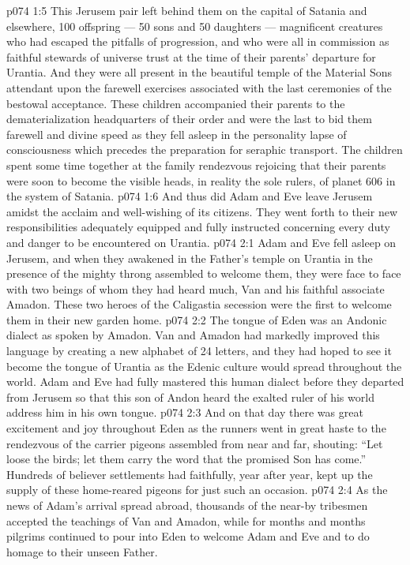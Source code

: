 \vs p074 1:5 \pc This Jerusem pair left behind them on the capital of Satania and elsewhere, 100 offspring --- 50 sons and 50 daughters --- magnificent creatures who had escaped the pitfalls of progression, and who were all in commission as faithful stewards of universe trust at the time of their parents’ departure for Urantia. And they were all present in the beautiful temple of the Material Sons attendant upon the farewell exercises associated with the last ceremonies of the bestowal acceptance. These children accompanied their parents to the dematerialization headquarters of their order and were the last to bid them farewell and divine speed as they fell asleep in the personality lapse of consciousness which precedes the preparation for seraphic transport. The children spent some time together at the family rendezvous rejoicing that their parents were soon to become the visible heads, in reality the sole rulers, of planet 606 in the system of Satania.
\vs p074 1:6 And thus did Adam and Eve leave Jerusem amidst the acclaim and well\hyp{}wishing of its citizens. They went forth to their new responsibilities adequately equipped and fully instructed concerning every duty and danger to be encountered on Urantia.
\vs p074 2:1 Adam and Eve fell asleep on Jerusem, and when they awakened in the Father’s temple on Urantia in the presence of the mighty throng assembled to welcome them, they were face to face with two beings of whom they had heard much, Van and his faithful associate Amadon. These two heroes of the Caligastia secession were the first to welcome them in their new garden home.
\vs p074 2:2 The tongue of Eden was an Andonic dialect as spoken by Amadon. Van and Amadon had markedly improved this language by creating a new alphabet of 24 letters, and they had hoped to see it become the tongue of Urantia as the Edenic culture would spread throughout the world. Adam and Eve had fully mastered this human dialect before they departed from Jerusem so that this son of Andon heard the exalted ruler of his world address him in his own tongue.
\vs p074 2:3 And on that day there was great excitement and joy throughout Eden as the runners went in great haste to the rendezvous of the carrier pigeons assembled from near and far, shouting: “Let loose the birds; let them carry the word that the promised Son has come.” Hundreds of believer settlements had faithfully, year after year, kept up the supply of these home\hyp{}reared pigeons for just such an occasion.
\vs p074 2:4 \pc As the news of Adam’s arrival spread abroad, thousands of the near\hyp{}by tribesmen accepted the teachings of Van and Amadon, while for months and months pilgrims continued to pour into Eden to welcome Adam and Eve and to do homage to their unseen Father.
